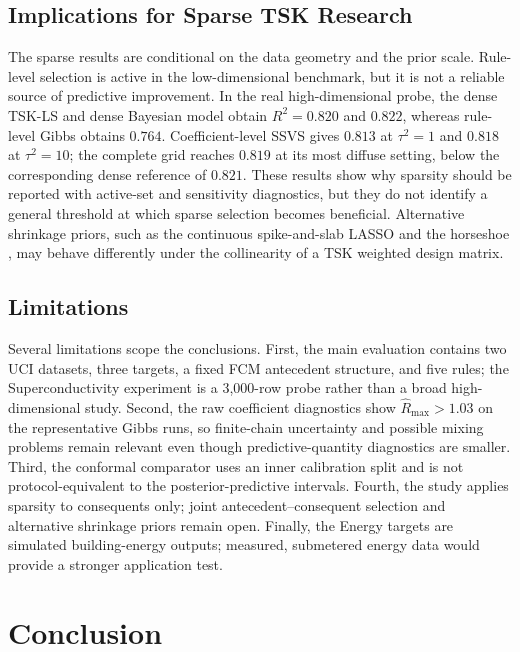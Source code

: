 \documentclass[1p,times]{elsarticle}
\begin{document}
\subsection{Implications for Sparse TSK Research}

The sparse results are conditional on the data geometry and the prior scale.
Rule-level selection is active in the low-dimensional benchmark, but it is not a reliable source of predictive improvement.
In the real high-dimensional probe, the dense TSK-LS and dense Bayesian model obtain $R^2=0.820$ and $0.822$, whereas rule-level Gibbs obtains $0.764$.
Coefficient-level SSVS gives $0.813$ at $\tau^2=1$ and $0.818$ at $\tau^2=10$; the complete grid reaches $0.819$ at its most diffuse setting, below the corresponding dense reference of $0.821$.
These results show why sparsity should be reported with active-set and sensitivity diagnostics, but they do not identify a general threshold at which sparse selection becomes beneficial.
Alternative shrinkage priors, such as the continuous spike-and-slab LASSO \cite{rockova2018spikeslab} and the horseshoe \cite{carvalho2010horseshoe}, may behave differently under the collinearity of a TSK weighted design matrix.

\subsection{Limitations}

Several limitations scope the conclusions.
First, the main evaluation contains two UCI datasets, three targets, a fixed FCM antecedent structure, and five rules; the Superconductivity experiment is a 3,000-row probe rather than a broad high-dimensional study.
Second, the raw coefficient diagnostics show \(\hat R_{\max}>1.03\) on the representative Gibbs runs, so finite-chain uncertainty and possible mixing problems remain relevant even though predictive-quantity diagnostics are smaller.
Third, the conformal comparator uses an inner calibration split and is not protocol-equivalent to the posterior-predictive intervals.
Fourth, the study applies sparsity to consequents only; joint antecedent--consequent selection \cite{gu2018bayesian} and alternative shrinkage priors remain open.
Finally, the Energy targets are simulated building-energy outputs; measured, submetered energy data would provide a stronger application test.

\section{Conclusion}
\label{sec:conclusion}
\end{document}
